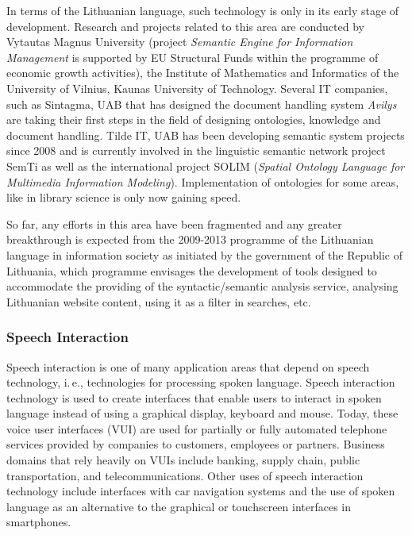 \begin{multicols}{2}
   In terms of the Lithuanian language, such technology is only in its early stage of development. Research and projects related to this area are conducted by Vytautas Magnus University (project \textit{Semantic Engine for Information Management} is supported by EU Structural Funds within the programme of economic growth activities), the Institute of Mathematics and Informatics of the University of Vilnius, Kaunas University of Technology. Several IT companies, such as Sintagma, UAB that has designed the document handling system \textit{Avilys} are taking their first steps in the field of designing ontologies, knowledge and document handling. Tilde IT, UAB has been developing semantic system projects since 2008 and is currently involved in the linguistic semantic network project SemTi as well as the international project SOLIM (\textit{Spatial Ontology Language for Multimedia Information Modeling}). Implementation of ontologies for some areas, like in library science is only now gaining speed.

    So far, any efforts in this area have been fragmented and any greater breakthrough is expected from the 2009-2013 programme of the Lithuanian language in information society as initiated by the government of the Republic of Lithuania, which programme envisages the development of tools designed to accommodate the providing of the syntactic/semantic analysis service, analysing Lithuanian website content, using it as a filter in searches, etc.

\subsubsection{Speech Interaction}

Speech interaction is one of many application areas that depend on speech technology, i.\,e., technologies for processing spoken language. Speech interaction technology is used to create interfaces that enable users to interact in spoken language instead of using a graphical display, keyboard and mouse.  Today, these voice user interfaces (VUI) are used for partially or fully automated telephone services provided by companies to customers, employees or partners. Business domains that rely heavily on VUIs include banking, supply chain, public transportation, and telecommunications. Other uses of speech interaction technology include interfaces with car navigation systems and the use of spoken language as an alternative to the graphical or touchscreen interfaces in smartphones.


\end{multicols}
